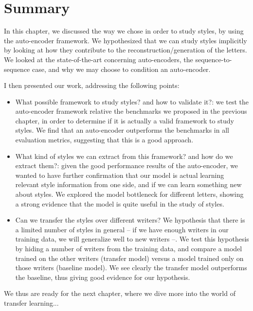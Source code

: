   \section{Summary}
  \par In this chapter, we discussed the way we chose in order to study styles, by using the auto-encoder framework. We hypothesized that we can study styles implicitly by looking at how they contribute to the reconstruction/generation of the letters. We looked at the state-of-the-art concerning auto-encoders, the sequence-to-sequence case, and why we may choose to condition an auto-encoder.
  \par I then presented our work, addressing the following points:
  \begin{itemize}
    \item What possible framework to study styles? and how to validate it?: we test the auto-encoder framework relative the benchmarks we proposed in the previous chapter, in order to determine if it is actually a valid framework to study styles. We find that an auto-encoder outperforms the benchmarks in all evaluation metrics, suggesting that this is a good approach.
    \item What kind of styles we can extract from this framework? and how do we extract them?: given the good performance results of the auto-encoder, we wanted to have further confirmation that our model is actual learning relevant style information from one side, and if we can learn something new about styles. We explored the model bottleneck for different letters, showing a strong evidence that the model is quite useful in the study of styles.
    \item Can we transfer the styles over different writers? We hypothesis that there is a limited number of styles in general -- if we have enough writers in our training data, we will generalize well to new writers --. We test this hypothesis by hiding a number of writers from the training data, and compare a model trained on the other writers (transfer model) versus a model trained only on those writers (baseline model). We see clearly the transfer model outperforms the baseline, thus giving good evidence for our hypothesis.
  \end{itemize}

  We thus are ready for the next chapter, where we dive more into the world of transfer learning...
